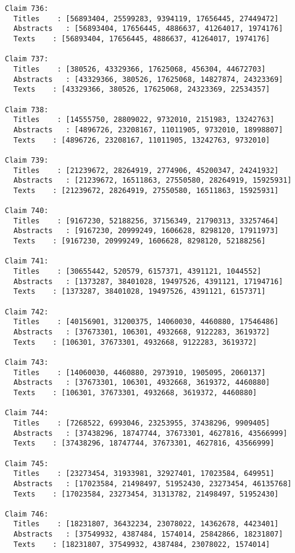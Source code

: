 \documentclass[11pt]{article}
\begin{document}
\begin{Verbatim}[commandchars=\\\{\}]
Claim 736:
  Titles    : [56893404, 25599283, 9394119, 17656445, 27449472]
  Abstracts   : [56893404, 17656445, 4886637, 41264017, 1974176]
  Texts    : [56893404, 17656445, 4886637, 41264017, 1974176]

Claim 737:
  Titles    : [380526, 43329366, 17625068, 456304, 44672703]
  Abstracts   : [43329366, 380526, 17625068, 14827874, 24323369]
  Texts    : [43329366, 380526, 17625068, 24323369, 22534357]

Claim 738:
  Titles    : [14555750, 28809022, 9732010, 2151983, 13242763]
  Abstracts   : [4896726, 23208167, 11011905, 9732010, 18998807]
  Texts    : [4896726, 23208167, 11011905, 13242763, 9732010]

Claim 739:
  Titles    : [21239672, 28264919, 2774906, 45200347, 24241932]
  Abstracts   : [21239672, 16511863, 27550580, 28264919, 15925931]
  Texts    : [21239672, 28264919, 27550580, 16511863, 15925931]

Claim 740:
  Titles    : [9167230, 52188256, 37156349, 21790313, 33257464]
  Abstracts   : [9167230, 20999249, 1606628, 8298120, 17911973]
  Texts    : [9167230, 20999249, 1606628, 8298120, 52188256]

Claim 741:
  Titles    : [30655442, 520579, 6157371, 4391121, 1044552]
  Abstracts   : [1373287, 38401028, 19497526, 4391121, 17194716]
  Texts    : [1373287, 38401028, 19497526, 4391121, 6157371]

Claim 742:
  Titles    : [40156901, 31200375, 14060030, 4460880, 17546486]
  Abstracts   : [37673301, 106301, 4932668, 9122283, 3619372]
  Texts    : [106301, 37673301, 4932668, 9122283, 3619372]

Claim 743:
  Titles    : [14060030, 4460880, 2973910, 1905095, 2060137]
  Abstracts   : [37673301, 106301, 4932668, 3619372, 4460880]
  Texts    : [106301, 37673301, 4932668, 3619372, 4460880]

Claim 744:
  Titles    : [7268522, 6993046, 23253955, 37438296, 9909405]
  Abstracts   : [37438296, 18747744, 37673301, 4627816, 43566999]
  Texts    : [37438296, 18747744, 37673301, 4627816, 43566999]

Claim 745:
  Titles    : [23273454, 31933981, 32927401, 17023584, 649951]
  Abstracts   : [17023584, 21498497, 51952430, 23273454, 46135768]
  Texts    : [17023584, 23273454, 31313782, 21498497, 51952430]

Claim 746:
  Titles    : [18231807, 36432234, 23078022, 14362678, 4423401]
  Abstracts   : [37549932, 4387484, 1574014, 25842866, 18231807]
  Texts    : [18231807, 37549932, 4387484, 23078022, 1574014]


\end{Verbatim}
\end{document}
